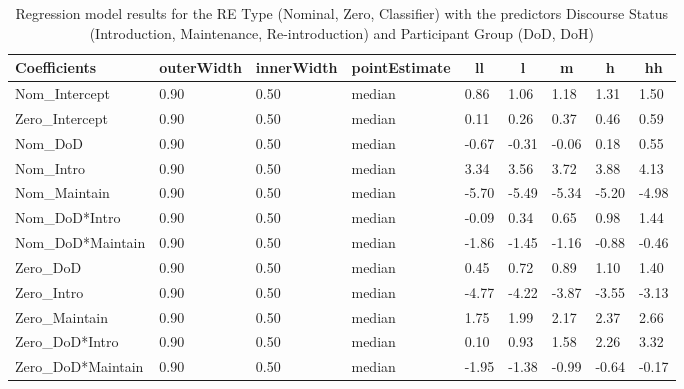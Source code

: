 \documentclass[]{elsarticle} %
\begin{document}
\begin{table}[hbt!]

\begin{center}
\begin{threeparttable}

\caption{\label{tab:unnamed-chunk-4}Regression model results for the RE Type (Nominal, Zero, Classifier) with the predictors Discourse Status (Introduction, Maintenance, Re-introduction) and Participant Group (DoD, DoH)}

\small{

\begin{tabular}{lllllllll}
\toprule
Coefficients & \multicolumn{1}{c}{outerWidth} & \multicolumn{1}{c}{innerWidth} & \multicolumn{1}{c}{pointEstimate} & \multicolumn{1}{c}{ll} & \multicolumn{1}{c}{l} & \multicolumn{1}{c}{m} & \multicolumn{1}{c}{h} & \multicolumn{1}{c}{hh}\\
\midrule
Nom\_Intercept & 0.90 & 0.50 & median & 0.86 & 1.06 & 1.18 & 1.31 & 1.50\\
Zero\_Intercept & 0.90 & 0.50 & median & 0.11 & 0.26 & 0.37 & 0.46 & 0.59\\
Nom\_DoD & 0.90 & 0.50 & median & -0.67 & -0.31 & -0.06 & 0.18 & 0.55\\
Nom\_Intro & 0.90 & 0.50 & median & 3.34 & 3.56 & 3.72 & 3.88 & 4.13\\
Nom\_Maintain & 0.90 & 0.50 & median & -5.70 & -5.49 & -5.34 & -5.20 & -4.98\\
Nom\_DoD*Intro & 0.90 & 0.50 & median & -0.09 & 0.34 & 0.65 & 0.98 & 1.44\\
Nom\_DoD*Maintain & 0.90 & 0.50 & median & -1.86 & -1.45 & -1.16 & -0.88 & -0.46\\
Zero\_DoD & 0.90 & 0.50 & median & 0.45 & 0.72 & 0.89 & 1.10 & 1.40\\
Zero\_Intro & 0.90 & 0.50 & median & -4.77 & -4.22 & -3.87 & -3.55 & -3.13\\
Zero\_Maintain & 0.90 & 0.50 & median & 1.75 & 1.99 & 2.17 & 2.37 & 2.66\\
Zero\_DoD*Intro & 0.90 & 0.50 & median & 0.10 & 0.93 & 1.58 & 2.26 & 3.32\\
Zero\_DoD*Maintain & 0.90 & 0.50 & median & -1.95 & -1.38 & -0.99 & -0.64 & -0.17\\
\bottomrule
\end{tabular}

}

\end{threeparttable}
\end{center}

\end{table}
\end{document}
